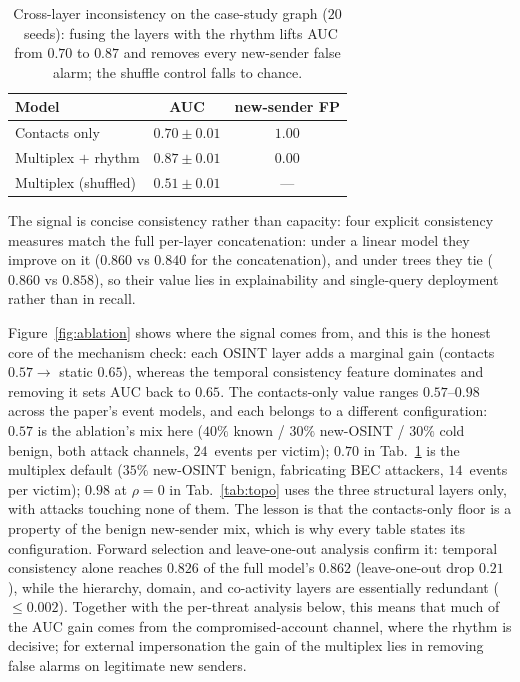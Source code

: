 \documentclass[conference]{IEEEtran}
\begin{document}
\begin{table}[t]\centering
\caption{Cross-layer inconsistency on the case-study graph ($20$~seeds): fusing the layers with the rhythm
lifts AUC from $0.70$ to $0.87$ and removes every new-sender false alarm; the shuffle control falls to
chance.}
\label{tab:inv1}
\begin{tabular}{lcc}
\toprule
Model & AUC & new-sender FP \\
\midrule
Contacts only & $0.70 \pm 0.01$ & $1.00$ \\
Multiplex $+$ rhythm & $\mathbf{0.87} \pm 0.01$ & $\mathbf{0.00}$ \\
Multiplex (shuffled) & $0.51 \pm 0.01$ & --- \\
\bottomrule
\end{tabular}
\end{table}

The signal is concise consistency rather than capacity: four explicit consistency measures match the
full per-layer concatenation: under a linear model they improve on it ($0.860$ vs $0.840$ for the
concatenation), and under trees they tie ($0.860$ vs $0.858$),
 so their value lies in explainability and single-query deployment rather than in recall.

Figure~\ref{fig:ablation} shows where the signal comes from, and this is the honest core of the mechanism
check: each OSINT layer adds a marginal gain (contacts $0.57\!\to$ static $0.65$),
whereas the temporal
consistency feature dominates and removing it sets AUC back to $0.65$. The contacts-only value ranges
$0.57$--$0.98$ across the paper's event models, and each belongs to a different configuration: $0.57$ is the
ablation's mix here ($40\%$ known / $30\%$ new-OSINT / $30\%$ cold benign, both attack channels,
$24$~events per victim); $0.70$ in Tab.~\ref{tab:inv1} is the multiplex default ($35\%$ new-OSINT benign,
fabricating BEC attackers, $14$~events per victim); $0.98$ at $\rho{=}0$ in Tab.~\ref{tab:topo} uses the
three structural layers only, with attacks touching none of them. The lesson is that the contacts-only floor
is a property of the benign new-sender mix, which is why every table states its configuration.
Forward selection and leave-one-out
analysis confirm it: temporal consistency alone reaches $0.826$ of the full model's $0.862$ (leave-one-out
drop $0.21$), while the hierarchy, domain, and co-activity layers are essentially redundant ($\le0.002$).
Together with the per-threat analysis below, this means that much of the AUC gain comes from the
compromised-account channel, where the rhythm is decisive; for external impersonation the gain of the
multiplex lies in removing false alarms on legitimate new senders.
\end{document}
